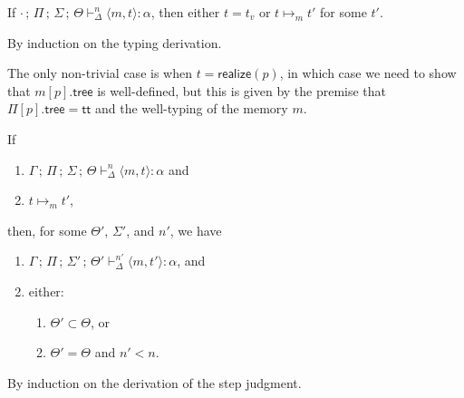 \documentclass{article}
\newcommand{\mf}[1]{\mathsf{#1}}
\newcommand{\semi}{\,;\,}
\newcommand{\pair}[2]{\langle #1, #2 \rangle}
\renewcommand{\tt}{\mf{tt}}
\begin{document}
\begin{lemma}
If $\cdot \semi \Pi \semi \Sigma \semi \Theta 
\vdash^n_\Delta \pair{m}{t}: \alpha$,
then either $t=t_v$ or $t \mapsto_m t'$ for some $t'$.

\begin{Proof}
By induction on the typing derivation.

The only non-trivial case is when $t=\mf{realize}(p)$,
in which case we need to show that $m[p].\mf{tree}$
is well-defined, but this is given by the premise
that $\Pi[p].\mf{tree} = \tt$ and the well-typing of the memory $m$.
\end{Proof}
\end{lemma}

\begin{lemma}
If \begin{enumerate}[label=(\roman*)]
\item $\Gamma \semi \Pi \semi \Sigma \semi \Theta
\vdash_\Delta^n \pair{m}{t}: \alpha$ and
\item $t \mapsto_m t'$,
\end{enumerate}
then, for some $\Theta'$, $\Sigma'$, and $n'$, we have
\begin{enumerate}[label=(\roman*)]
\item $\Gamma \semi \Pi \semi \Sigma' \semi \Theta'
\vdash_\Delta^{n'} \pair{m}{t'}: \alpha$, and
\item either: \begin{enumerate}[label=(ii-\alph*)]
  \item $\Theta' \subset \Theta$, or
  \item $\Theta' = \Theta$ and $n' < n$.
\end{enumerate}
\end{enumerate}

\begin{Proof}
By induction on the derivation of the step judgment.


\end{Proof}
\end{lemma}
\end{document}
